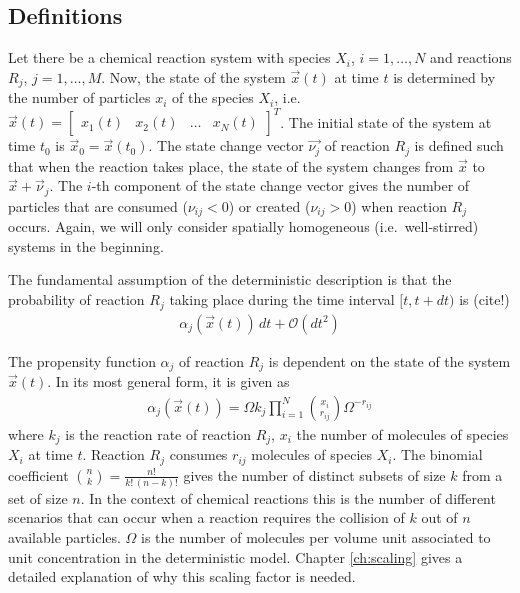 \subsection{Definitions} %
\label{ch:def_stoch}
Let there be a chemical reaction system with species $X_i$, $i=1, \ldots,N$ and reactions $R_j$, $j=1, \ldots,M$. Now, the state of the system $\vec{x}(t)$ at time $t$ is determined by the number of particles $x_i$ of the species $X_i$, i.e.\ $\vec{x}(t) = \begin{bmatrix} x_1(t) & x_2(t) & \ldots & x_N(t)\end{bmatrix}^T$. The initial state of the system at time $t_0$ is $\vec{x}_0 = \vec{x}(t_0)$. The state change vector $\vec{\nu_j}$ of reaction $R_j$ is defined such that when the reaction takes place, the state of the system changes from $\vec{x}$ to $\vec{x} + \vec{\nu}_j$. The $i$-th component of the state change vector gives the number of particles that are consumed ($\nu_{ij} < 0$) or created ($\nu_{ij} > 0$) when reaction $R_j$ occurs. Again, we will only consider spatially homogeneous (i.e.\ well-stirred) systems in the beginning. 

The fundamental assumption of the deterministic description is that the probability of reaction $R_j$ taking place during the time interval $\lbrack t, t + dt)$ is (cite!)
\begin{align}
\label{eq:assumption}
\alpha_j(\vec{x}(t)) \, dt + \mathcal{O}(dt^2)
\end{align}

The propensity function $\alpha_j$ of reaction $R_j$ is dependent on the state of the system $\vec{x}(t)$. In its most general form, it is given as
\begin{align}
\label{eq:propensity}
\alpha_j(\vec{x}(t)) = \Omega k_j \prod_{i=1}^N \binom{x_i}{r_{ij}} \Omega^{-r_{ij}}
\end{align}
where $k_j$ is the reaction rate of reaction $R_j$, $x_i$ the number of molecules of species $X_i$ at time $t$. Reaction $R_j$ consumes $r_{ij}$ molecules of species $X_i$. The binomial coefficient $\binom{n}{k} = \frac{n!}{k!\,(n-k)!}$ gives the number of distinct subsets of size $k$ from a set of size $n$. In the context of chemical reactions this is the number of different scenarios that can occur when a reaction requires the collision of $k$ out of $n$ available particles. $\Omega$ is the number of molecules per volume unit associated to unit concentration in the deterministic model. Chapter \ref{ch:scaling} gives a detailed explanation of why this scaling factor is needed. 

